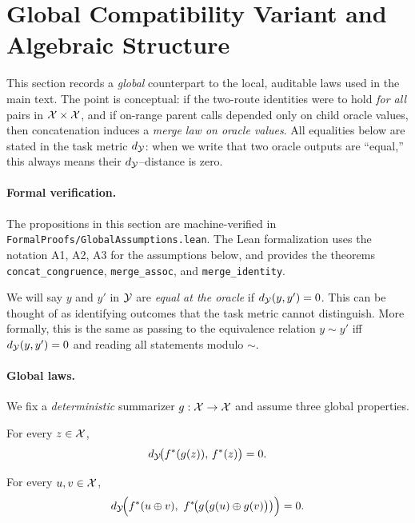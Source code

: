 \section{Global Compatibility Variant and Algebraic Structure}\label{sec:global}

This section records a \emph{global} counterpart to the local, auditable laws used in the main text. The point is conceptual: if the two-route identities were to hold \emph{for all} pairs in $\mathcal{X}\times\mathcal{X}$, and if on-range parent calls depended only on child oracle values, then concatenation induces a \emph{merge law on oracle values}. All equalities below are stated in the task metric $d_{\mathcal{Y}}$: when we write that two oracle outputs are ``equal,'' this always means their $d_{\mathcal{Y}}$–distance is zero.

\paragraph{Formal verification.} The propositions in this section are machine-verified in \texttt{FormalProofs/GlobalAssumptions.lean}. The Lean formalization uses the notation A1, A2, A3 for the assumptions below, and provides the theorems \texttt{concat\_congruence}, \texttt{merge\_assoc}, and \texttt{merge\_identity}.

\begin{remark}
We will say $y$ and $y'$ in $\mathcal{Y}$ are \emph{equal at the oracle} if $d_{\mathcal{Y}}(y,y')=0$. This can be thought of as identifying outcomes that the task metric cannot distinguish. More formally, this is the same as passing to the equivalence relation $y\sim y'$ iff $d_{\mathcal{Y}}(y,y')=0$ and reading all statements modulo $\sim$.
\end{remark}

\paragraph{Global laws.} We fix a \emph{deterministic} summarizer $g:\mathcal{X}\to\mathcal{X}$ and assume three global properties.

\begin{assumption}\label{ass:app1}
For every $z\in\mathcal{X}$,
\[
d_{\mathcal{Y}}\!\big(f^{\ast}(g(z)),\,f^{\ast}(z)\big)=0.
\]
\end{assumption}

\begin{assumption}\label{ass:app2}
For every $u,v\in\mathcal{X}$,
\[
\metric\!\Big(\fstar(u\concat v),\ \fstar\!\big(g\big(g(u)\concat g(v)\big)\big)\Big)=0.
\]
\end{assumption}

